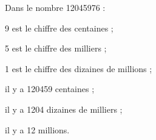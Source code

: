 \begin{exemple*}{}{}
Dans le nombre \num{12045976} :
\begin{itemize}[label=$-$]
\begin{minipage}[t]{0.55\linewidth}
	\item 9 est le chiffre des centaines ;
	\item 5 est le chiffre des milliers ;
	\item 1 est le chiffre des dizaines de millions ;
\end{minipage}
\begin{minipage}[t]{0.38\linewidth}
	\item il y a \num{120459} centaines ;
	\item il y a \num{1204} dizaines de milliers ;
	\item il y a 12 millions.
\end{minipage}
\end{itemize}
\end{exemple*}